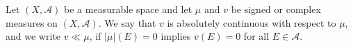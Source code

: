 Let $(X, \mathcal{A})$ be a measurable space and let $\mu$ and $v$ be signed or complex measures on $(X, \mathcal{A})$. We say that $v$ is absolutely continuous with respect to $\mu$, and we write $v \ll \mu$, if $|\mu|(E) = 0$ implies $v(E) = 0$ for all $E \in \mathcal{A}$.